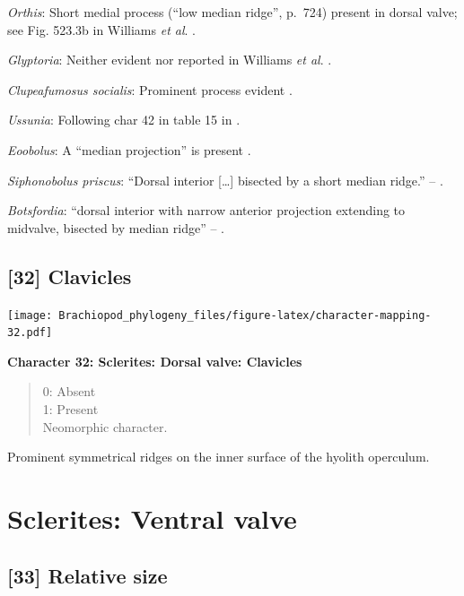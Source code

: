 \documentclass[openany]{book}
\theoremstyle{definition}
\theoremstyle{definition}
\theoremstyle{definition}
\theoremstyle{remark}
\begin{document}
\emph{Orthis}: Short medial process (``low median ridge'', p.~724)
present in dorsal valve; see Fig. 523.3b in Williams \emph{et al}.
\citeyearpar{Williams2000BrachiopodaLinguliformea}.

\emph{Glyptoria}: Neither evident nor reported in Williams \emph{et al}.
\citeyearpar{Williams2000BrachiopodaLinguliformea}.

\emph{Clupeafumosus socialis}: Prominent process evident
\citep{Topper2013Reappraisalof}.

\emph{Ussunia}: Following char 42 in table 15 in
\citet{Williams2000BrachiopodaLinguliformea}.

\emph{Eoobolus}: A ``median projection'' is present \citep[fig. 4g
in][]{Balthasar2009Thebrachiopod}.

\emph{Siphonobolus priscus}: ``Dorsal interior {[}\ldots{}{]} bisected
by a short median ridge.'' -- \citet{Popov2009Earlyontogeny}.

\emph{Botsfordia}: ``dorsal interior with narrow anterior projection
extending to midvalve, bisected by median ridge'' --
\citet{Williams2000BrachiopodaLinguliformea}.

\hypertarget{clavicles}{%
\subsection*{{[}32{]} Clavicles}\label{clavicles}}

\texttt{[image: Brachiopod\_phylogeny\_files/figure-latex/character-mapping-32.pdf]}

\textbf{Character 32: Sclerites: Dorsal valve: Clavicles}

\begin{quote}
0: Absent\\
1: Present\\
Neomorphic character.
\end{quote}

Prominent symmetrical ridges on the inner surface of the hyolith
operculum.

\hypertarget{sclerites-ventral-valve}{%
\section{Sclerites: Ventral valve}\label{sclerites-ventral-valve}}

\hypertarget{relative-size}{%
\subsection*{{[}33{]} Relative size}\label{relative-size}}
\end{document}
